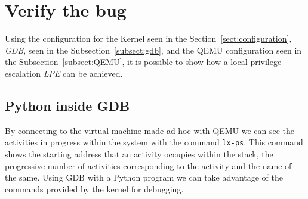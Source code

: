 \documentclass{masterthesis}
\newcommand{\refToSection}[1]{Section~\ref{sect:#1}\xspace}
\newcommand{\refToSubSection}[1]{Subsection~\ref{subsect:#1}\xspace}
\begin{document}
\section{Verify the bug}
\label{sect:bug}


Using the configuration for the Kernel seen in the \refToSection{configuration}, \emph{GDB}, seen in the \refToSubSection{gdb}, and the QEMU configuration seen in the \refToSubSection{QEMU}, it is possible to show how a local privilege escalation \emph{LPE} can be achieved.



\subsection{Python inside GDB}
\label{subsect:py_gdb}

By connecting to the virtual machine made ad hoc with QEMU we can see the activities in progress within the system with the command \texttt{lx-ps}.
This command shows the starting address that an activity occupies within the stack, the progressive number of activities corresponding to the activity and the name of the same.
Using GDB with a Python program we can take advantage of the commands provided by the kernel for debugging.
\end{document}
